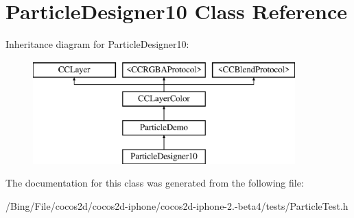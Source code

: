 \hypertarget{interface_particle_designer10}{\section{Particle\-Designer10 Class Reference}
\label{interface_particle_designer10}
}
Inheritance diagram for Particle\-Designer10\-:\begin{figure}[H]
\begin{center}
\leavevmode
\includegraphics[height=4.000000cm]{interface_particle_designer10}
\end{center}
\end{figure}


The documentation for this class was generated from the following file\-:\begin{DoxyCompactItemize}
\item 
/\-Bing/\-File/cocos2d/cocos2d-\/iphone/cocos2d-\/iphone-\/2.-\/beta4/tests/Particle\-Test.\-h\end{DoxyCompactItemize}
